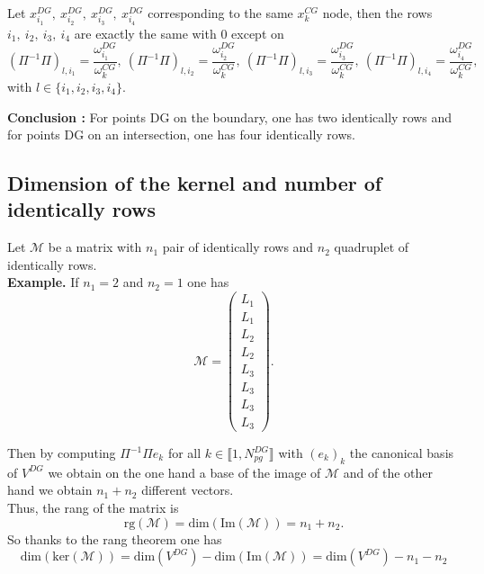 \documentclass[a4paper, 11pt]{report}
\begin{document}
Let $x_{i_1}^{DG}, \ x_{i_2}^{DG}, \ x_{i_3}^{DG}, \ x_{i_4}^{DG}$ corresponding to the same $x_k^{CG}$ node, then 
the rows $i_1, \ i_2, \ i_3, \ i_4$ are exactly the same with 0 except on 
\begin{equation*}
\left(\Pi^{-1}\Pi\right)_{l,i_1}=\frac{\omega_{i_1}^{DG}}{\omega_k^{CG}}, \ \left(\Pi^{-1}\Pi\right)_{l,i_2}=\frac{\omega_{i_2}^{DG}}{\omega_k^{CG}}, \ \left(\Pi^{-1}\Pi\right)_{l,i_3}=\frac{\omega_{i_3}^{DG}}{\omega_k^{CG}}, \ \left(\Pi^{-1}\Pi\right)_{l,i_4}=\frac{\omega_{i_4}^{DG}}{\omega_k^{CG}},
\end{equation*} 
with $l\in\{i_1, i_2, i_3, i_4\}$.

\textbf{Conclusion :} For points DG on the boundary, one has two identically rows and for points DG on an intersection, one has four identically rows.
\subsection{Dimension of the kernel and number of identically rows}
Let $\mathscr{M}$ be a matrix with $n_1$ pair of identically rows and $n_2$ quadruplet of identically rows.\\
\textbf{Example.} If $n_1=2$ and $n_2=1$ one has
\begin{equation*}
\mathscr{M}=
\begin{pmatrix}
L_1\\ L_1\\ L_2\\ L_2 \\ L_3\\ L_3\\ L_3\\ L_3
\end{pmatrix}.
\end{equation*}

Then by computing $\Pi^{-1}\Pi e_k$ for all $k\in\llbracket 1,N_{pg}^{DG}\rrbracket$ with $(e_k)_k$ the canonical basis of $V^{DG}$ we obtain on the one hand a base of the image of $\mathscr{M}$ and of the other hand we obtain $n_1+n_2$ different vectors.\\
Thus, the rang of the matrix is 
\begin{equation*}
\text{rg}(\mathscr{M})=\text{dim}(\text{Im}(\mathscr{M}))=n_1+n_2.
\end{equation*}
So thanks to the rang theorem one has
\begin{equation*}
\text{dim}(\text{ker}(\mathscr{M}))=\text{dim}(V^{DG})-\text{dim}(\text{Im}(\mathscr{M}))=\text{dim}(V^{DG})-n_1-n_2
\end{equation*}
\end{document}
